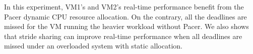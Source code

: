 In this experiment, VM1's and VM2's real-time performance benefit from the Pacer dynamic CPU resource allocation. On the contrary, all the deadlines are missed for the VM running the heavier workload without Pacer. We also shows that stride sharing can improve real-time performance when all deadlines are missed under an overloaded system with static allocation.


